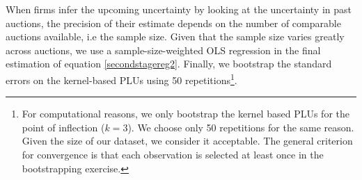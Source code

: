 %
%
%
%
%


When firms infer the upcoming uncertainty by looking at the uncertainty in past auctions, the precision of their estimate depends on the number of comparable auctions available, i.e the sample size. Given that the sample size varies greatly across auctions, we use a sample-size-weighted OLS regression in the final estimation of equation \ref{secondstagereg2}. Finally, we bootstrap the standard errors on the kernel-based PLUs using 50 repetitions\footnote{For computational reasons, we only bootstrap the kernel based PLUs for the point of inflection ($k=3$). We choose only 50 repetitions for the same reason. Given the size of our dataset, we consider it acceptable.  The general criterion for convergence is that each observation is selected at least once in the bootstrapping exercise.}.


